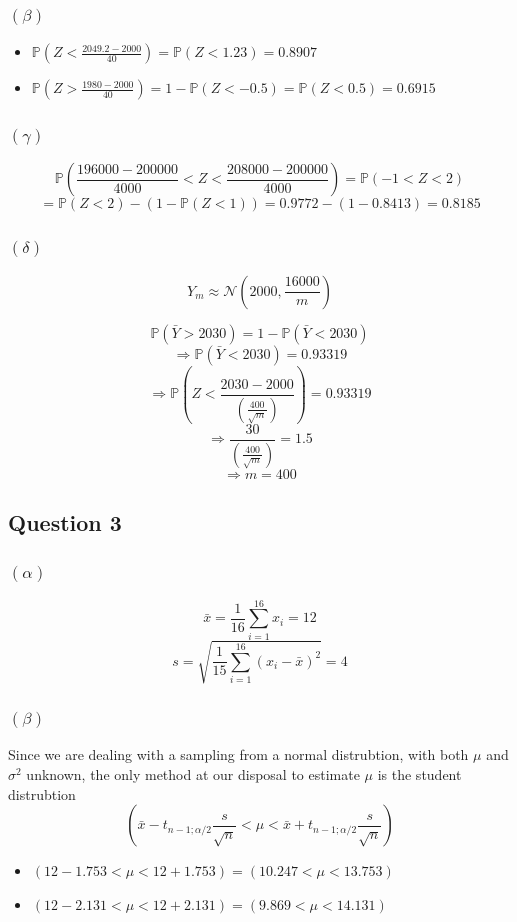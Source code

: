 \documentclass{article}
\begin{document}
\subsubsection*{\((\beta)\)}
\begin{itemize}
	\item \(\mathbb{P}(Z < \frac{2049.2 - 2000}{40}) = \mathbb{P}(Z < 1.23) = 0.8907\)
	\item \(\mathbb{P}(Z > \frac{1980-2000}{40}) = 1- \mathbb{P}(Z < - 0.5) = \mathbb{P}(Z < 0.5) = 0.6915\)
\end{itemize}

\subsubsection*{\((\gamma)\)}
\[
	\mathbb{P}(\frac{196000- 200000}{4000} < Z < \frac{208000 - 200000}{4000})
	= \mathbb{P}(-1 < Z < 2 )
\]
\[= \mathbb{P}(Z < 2) -(1 -\mathbb{P}( Z< 1))
	= 0.9772 - ( 1- 0.8413) = 0.8185
\]

\subsubsection*{\((\delta)\)}
\[
	Y_m \approx \mathcal{N}(2000, \frac{16000}{m})
\]

\[
	\mathbb{P}(\bar{Y} > 2030) = 1 - \mathbb{P}(\bar{Y} < 2030)
\]
\[
	\Rightarrow \mathbb{P}(\bar{Y} < 2030) = 0.93319
\]
\[
	\Rightarrow \mathbb{P}\left(Z < \frac{2030- 2000}{\left(\frac{400}{\sqrt{m}}\right)}\right) = 0.93319
\]
\[
	\Rightarrow \frac{30}{\left(\frac{400}{\sqrt{m}}\right)} = 1.5
\]
\[
	\Rightarrow m = 400
\]


\subsection*{Question 3}
\subsubsection*{\((\alpha)\)}
\[
	\bar{x} =  \frac{1}{16} \sum_{i=1}^{16} x_i = 12
\]
\[
	s = \sqrt{\frac{1}{15} \sum_{i=1}^{16} (x_i - \bar{x})^2} = 4
\]

\subsubsection*{\((\beta)\)}
Since we are dealing with a sampling from a normal distrubtion, with both
\(\mu\) and \(\sigma^2\) unknown, the only method at our disposal to
estimate \(\mu\) is the student distrubtion
\[
	(\bar{x} - t_{n-1;\alpha/2}\frac{s}{\sqrt{n}} < \mu < \bar{x} + t_{n-1;\alpha/2}\frac{s}{\sqrt{n}} )
\]
\begin{itemize}
	\item \((12 - 1.753 < \mu < 12 + 1.753) = (10.247 < \mu < 13.753)\)
	\item \((12 - 2.131 < \mu < 12 + 2.131) = (9.869 < \mu < 14.131)\)
\end{itemize}
\end{document}

